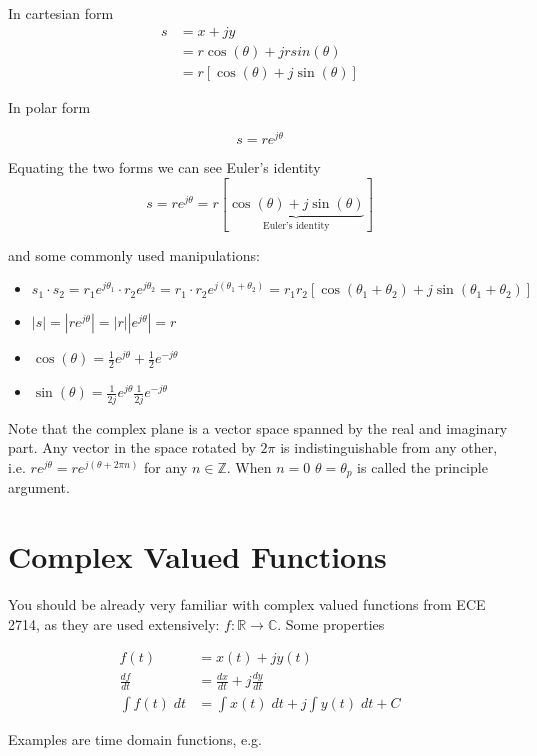 \documentclass{article}
\begin{document}
In cartesian form
\begin{align}
  s &= x + jy\\
  &= r\cos(\theta) + jrsin(\theta)\\
  &= r\left[ \cos(\theta) + j\sin(\theta)\right]
\end{align}

In polar form

\[
s = r e^{j\theta}
\]

Equating the two forms we can see Euler's identity
\[
s = r e^{j\theta} = r\left[ \underbrace{\cos(\theta) + j\sin(\theta)}_{\text{Euler's identity}}\right]
\]

and some commonly used manipulations:

\begin{itemize}
\item $s_1 \cdot s_2 = r_1 e^{j\theta_1} \cdot r_2 e^{j\theta_2} = r_1 \cdot r_2 e^{j(\theta_1 + \theta_2)} = r_1 r_2\left[\cos(\theta_1 + \theta_2) + j\sin(\theta_1 + \theta_2)\right]$
\item $|s| = |r e^{j\theta}| = |r||e^{j\theta}| = r$
\item $\cos(\theta) = \frac{1}{2}e^{j\theta} + \frac{1}{2}e^{-j\theta}$
\item $\sin(\theta) = \frac{1}{2j}e^{j\theta}  \frac{1}{2j}e^{-j\theta}$
\end{itemize}

Note that the complex plane is a vector space spanned by the real and imaginary part. Any vector in the space rotated by $2\pi$ is indistinguishable from any other, i.e. $r e^{j\theta} = re^{j(\theta + 2\pi n)}$ for any $n\in\mathbb{Z}$. When $n = 0$ $\theta = \theta_p$ is called the principle argument.

\section{Complex Valued Functions}

You should be already very familiar with complex valued functions from ECE 2714, as they are used extensively: $f: \mathbb{R} \rightarrow \mathbb{C}$. Some properties

\begin{align}
  f(t) &= x(t) + jy(t)\\
  \frac{df}{dt} &= \frac{dx}{dt} + j\frac{dy}{dt}\\
  \int f(t)\; dt &= \int x(t)\; dt + j\int y(t)\; dt + C
\end{align}

Examples are time domain functions, e.g.
\end{document}
